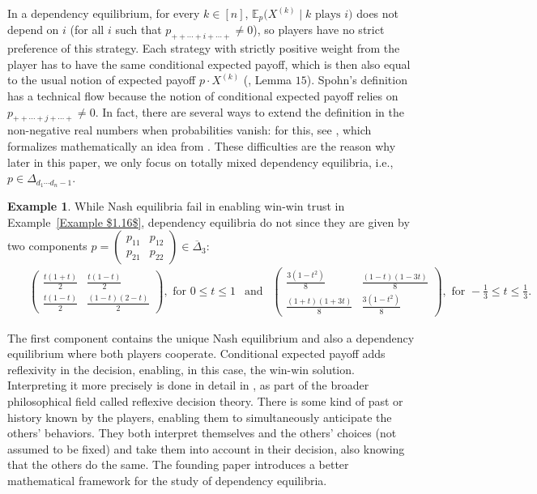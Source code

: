 \documentclass[11pt]{amsart}
\numberwithin{equation}{section}
\theoremstyle{plain}
\numberwithin{theorem}{section}
\theoremstyle{definition}
\newtheorem{example}[theorem]{Example}
\begin{document}
In a dependency equilibrium, for every $k\in[n]$, $\mathbb E_p\big(X^{(k)}\mid k\text{ plays }i\big)$ does not depend on $i$ (for all $i$ such that $p_{++\cdots+i+\cdots+}\ne0$), so players have no strict preference of this strategy. Each strategy with strictly positive weight from the player has to have the same conditional expected payoff, which is then also equal to the usual notion of expected payoff $p\cdot X^{(k)}$ (\cite{portakal2022geometry}, Lemma $15$). Spohn's definition has a technical flow because the notion of conditional expected payoff relies on $p_{++\cdots+j+\cdots+}\ne0$. In fact, there are several ways to extend the definition in the non-negative real numbers when probabilities vanish: for this, see \cite{portakal2024dependency}, which formalizes mathematically an idea from \cite{spohn2007dependency}. These difficulties are the reason why later in this paper, we only focus on totally mixed dependency equilibria, i.e., $p\in \Delta_{d_1 \cdots d_n -1}$.

\begin{example}\label{Example $1.18$}
 While Nash equilibria fail in enabling win-win trust in Example~\ref{Example $1.16$}, dependency equilibria do not since they are given by two components $p = \begin{pmatrix}
    p_{11} & p_{12}\\
    p_{21} & p_{22}
\end{pmatrix} \in \overline{\Delta}_3$:\begin{align*}
    &~~~\begin{pmatrix}
    \frac{t(1+t)}2 & \frac{t(1-t)}2\\
    \frac{t(1-t)}2 & \frac{(1-t)(2-t)}2
\end{pmatrix},\text{ for } 0\le t\le1 \ \ 
\text{ and }\ \ \begin{pmatrix}
    \frac{3(1-t^2)}8 & \frac{(1-t)(1-3t)}8\\
    \frac{(1+t)(1+3t)}8 & \frac{3(1-t^2)}8
\end{pmatrix},\text{ for } -\frac13\le t\le\frac13.
\end{align*}   
\end{example}

The first component contains the unique Nash equilibrium and also a dependency equilibrium where both players cooperate. Conditional expected payoff adds reflexivity in the decision, enabling, in this case, the win-win solution. Interpreting it more precisely is done in detail in \cite{spohn2003dependency}, as part of the broader philosophical field called reflexive decision theory. There is some kind of past or history known by the players, enabling them to simultaneously anticipate the others' behaviors. They both interpret themselves and the others' choices (not assumed to be fixed) and take them into account in their decision, also knowing that the others do the same. The founding paper \cite{portakal2022geometry} introduces a better mathematical framework for the study of dependency equilibria.
\end{document}
